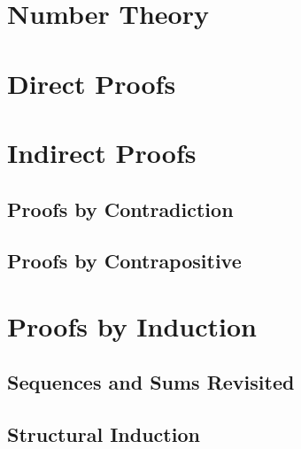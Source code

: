 \section{Number Theory}
    
\section{Direct Proofs}

\section{Indirect Proofs}
    \subsection{Proofs by Contradiction}
    \subsection{Proofs by Contrapositive}

\section{Proofs by Induction}
    \subsection{Sequences and Sums Revisited}
    \subsection{Structural Induction}
